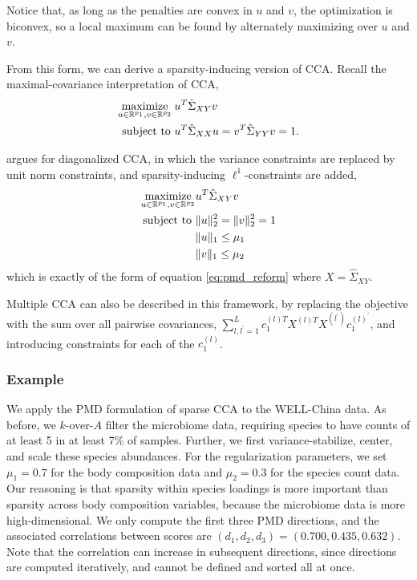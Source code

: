 \documentclass[utf8]{frontiersFPHY} %
\begin{document}
Notice that, as long as the penalties are convex in $u$ and $v$, the
optimization is biconvex, so a local maximum can be found by alternately
maximizing over $u$ and $v$.

From this form, we can derive a sparsity-inducing version of CCA. Recall the
maximal-covariance interpretation of CCA,
\begin{align*}
  \mathop\mathrm{maximize}_{u \in \mathbb{R}^{p_{1}}, v \in \mathbb{R}^{p_{2}}} \medspace
  &u^{T}\hat{\Sigma}_{XY}v \\ \text{subject to } &u^{T}\hat{\Sigma}_{XX} u = v^{
    T}\hat{\Sigma}_{YY}v = 1.
\end{align*}

\citep{witten2009penalized} argues for diagonalized CCA, in which the variance
constraints are replaced by unit norm constraints, and sparsity-inducing
$\ell^{1}$-constraints are added,
\begin{align*}
  \mathop\mathrm{maximize}_{u \in \mathbb{R}^{p_{1}}, v \in \mathbb{R}^{p_{2}}} & u^T\hat{\Sigma}_{XY}v
  \\ \text{subject to } &\|u\|_{2}^{2} = \|v\|_{2}^{2} = 1 \\ &\|u\|_{1} \leq
  \mu_{1} \\ &\|v\|_{1} \leq \mu_{2}
\end{align*}
which is exactly of the form of equation \ref{eq:pmd_reform} where $X =
\hat{\Sigma}_{XY}$.

Multiple CCA can also be described in this framework, by replacing the objective
with the sum over all pairwise covariances, $\sum_{l, l^{\prime} = 1}^{L}
c_{1}^{(l) T}X^{(l) T}X^{(l^{\prime})}c_{1}^{(l)^{\prime}}$, and introducing
constraints for each of the $c_{1}^{(l)}$.

\subsubsection{Example}
\label{subsec:sparse_cca_example}

We apply the PMD formulation of sparse CCA to the WELL-China data. As before, we
$k$-over-$A$ filter the microbiome data, requiring species to have counts of at
least 5 in at least 7\% of samples. Further, we first variance-stabilize,
center, and scale these species abundances. For the regularization parameters,
we set $\mu_1 = 0.7$ for the body composition data and $\mu_2 = 0.3$ for the
species count data. Our reasoning is that sparsity within species loadings is
more important than sparsity across body composition variables, because the
microbiome data is more high-dimensional. We only compute the first three PMD
directions, and the associated correlations between scores are $\left(d_1, d_2,
d_3\right) = \left(0.700, 0.435, 0.632\right)$. Note that the correlation can
increase in subsequent directions, since directions are computed iteratively,
and cannot be defined and sorted all at once.
\end{document}
